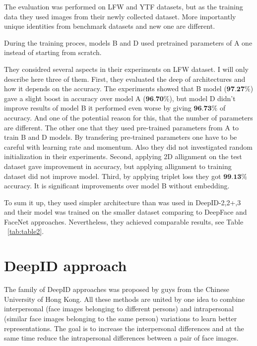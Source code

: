 \documentclass[paper=a4, fontsize=11pt]{scrartcl} %
\numberwithin{equation}{section} %
\numberwithin{figure}{section} %
\numberwithin{table}{section} %
\begin{document}
The evaluation was performed on LFW and YTF datasets, but as the training data they used images from their newly collected dataset. More importantly unique identities from benchmark datasets and new one are different.\par
During the training proces, models B and D used pretrained parameters of A one instead of starting from scratch. \par
They considred several aspects in their experiments on LFW dataset. I will only describe here three of them. First, they evaluated the deep of architectures and how it depends on the accuracy. The experiments showed that B model ($\textbf{97.27}\%$) gave a slight boost in accuracy over model A ($\textbf{96.70}\%$), but model D didn't improve results of model B it performed even worse by giving $\textbf{96.73}\%$ of accuracy. And one of the potential reason for this, that the number of parameters are different. The other one that they used pre-trained parameters from A to train B and D models. By transfering pre-trained parameters one have to be careful with learning rate and momentum. Also they did not investigated random initialization in their experiments. Second, applying 2D allignment on the test dataset gave improvement in accuracy, but applying allignment to training dataset did not improve model. Third, by applying triplet loss they got $\textbf{99.13\%}$ accuracy. It is significant improvements over model B without embedding. \par
To sum it up, they used simpler architecture than was used in DeepID-2,2+,3 \cite{sun2014deep, sun2015deeply, sun2015deepid3} and their model was trained on the smaller dataset comparing to DeepFace and FaceNet approaches. Nevertheless, they achieved comparable results, see Table ~\ref{tab:table2}.


\section{DeepID approach}

The family of DeepID approaches \cite{sun2014deepid, sun2014deep, sun2015deeply, sun2015deepid3} was proposed by guys from the Chinese University of Hong Kong. All these methods are united by one idea to combine interpersonal (face images belonging to different persons) and intrapersonal (similar face images belonging to the same person) variations to learn better representations. The goal is to increase the interpersonal differences and at the same time reduce the intrapersonal differences between a pair of face images.
\end{document}
